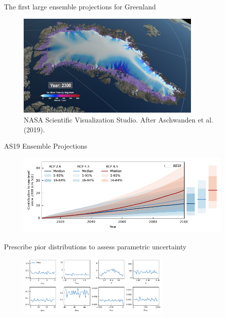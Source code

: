 \documentclass[hide notes,intlimits]{beamer}
\begin{document}
\begin{frame}{The first large ensemble projections for Greenland}
  \begin{figure}
    \includegraphics[width=0.8\textwidth]{Greenland_RCP_85_2008_2300_comp_4k.0293_print}
    \caption{NASA Scientific Visualization Studio. After Aschwanden et al. (2019).}
  \end{figure}
\end{frame}


\begin{frame}{AS19 Ensemble Projections}
  \begin{minipage}[t][4cm][t]{\textwidth}
    \begin{figure}
      \includegraphics[height=4cm]{projection_as19_bars}
    \end{figure}
  \end{minipage}
  \alert{Prescribe pior distributions to assess parametric uncertainty}
  \begin{minipage}[t][3cm][t]{\textwidth}
    \begin{figure}
      \includegraphics[height=3cm]{prior}
    \end{figure}
  \end{minipage}
\end{frame}
\end{document}
